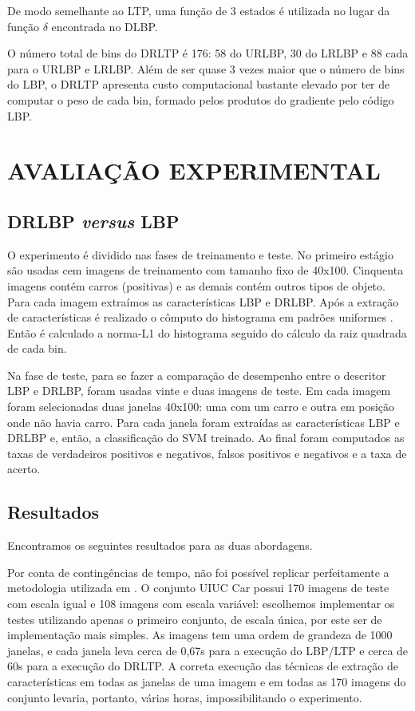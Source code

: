 \documentclass[a4paper,twocolumn]{article}
\begin{document}
De modo semelhante ao LTP, uma função de 3 estados é utilizada no lugar da função $\delta$ encontrada no DLBP.

O número total de bins do DRLTP é 176: 58 do URLBP, 30 do LRLBP e 88 cada para o URLBP e LRLBP. Além de ser quase 3 vezes maior que o número de bins do LBP, o DRLTP apresenta custo computacional bastante elevado por ter de computar o peso de cada bin, formado pelos produtos do gradiente pelo código LBP.




\section{AVALIAÇÃO EXPERIMENTAL}

\subsection{DRLBP \textit{versus} LBP}

O experimento é dividido nas fases de treinamento e teste. No primeiro estágio são usadas cem imagens de treinamento com tamanho fixo de 40x100. Cinquenta imagens contém carros (positivas) e as demais contém outros tipos de objeto. Para cada imagem extraímos as características LBP e DRLBP. Após a extração de características é realizado o cômputo do histograma em padrões uniformes \cite{chen}. Então é calculado a norma-L1 do histograma seguido do cálculo da raiz quadrada de cada bin.

Na fase de teste, para se fazer a comparação de desempenho entre o descritor LBP e DRLBP, foram usadas vinte e duas imagens de teste. Em cada imagem foram selecionadas duas janelas 40x100: uma com um carro e outra em posição onde não havia carro. Para cada janela foram extraídas as características LBP e DRLBP e, então, a classificação do SVM treinado. Ao final foram computados as taxas de verdadeiros positivos e negativos, falsos positivos e negativos e a taxa de acerto. 

\subsection{Resultados}

Encontramos os seguintes resultados para as duas abordagens.

Por conta de contingências de tempo, não foi possível replicar perfeitamente a metodologia utilizada em \cite{satpathy}. O conjunto UIUC Car possui 170 imagens de teste com escala igual e 108 imagens com escala variável: escolhemos implementar os testes utilizando apenas o primeiro conjunto, de escala única, por este ser de implementação mais simples. As imagens tem uma ordem de grandeza de 1000 janelas, e cada janela leva cerca de 0,67s para a execução do LBP/LTP e cerca de 60s para a execução do DRLTP. A correta execução das técnicas de extração de características em todas as janelas de uma imagem e em todas as 170 imagens do conjunto levaria, portanto, várias horas, impossibilitando o experimento.
\end{document}
